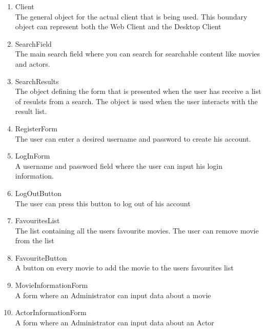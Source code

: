 \begin{enumerate}

	\item Client \hfill \\
	The general object for the actual client that is being used. This boundary object can represent both the Web Client and the Desktop Client

	\item SearchField \hfill \\
	The main search field where you can search for searchable content like movies and actors.
	
	\item SearchResults \hfill \\
	The object defining the form that is presented when the user has receive a list of resulsts from a search. The object is used when the user interacts with the result list.
	
	\item RegisterForm \hfill \\
	The user can enter a desired username and password to create his account.

	\item LogInForm \hfill \\
	A username and password field where the user can input his login information.
	
	\item LogOutButton \hfill \\
	The user can press this button to log out of his account
	
	\item FavouritesList \hfill \\
	The list containing all the users favourite movies. The user can remove movie from the list
	
	\item FavouriteButton \hfill \\
	A button on every movie to add the movie to the users favourites list
	
	\item MovieInformationForm \hfill \\
	A form where an Administrator can input data about a movie
	
	\item ActorInformationForm \hfill \\
	A form where an Administrator can input data about an Actor
	
	
\end{enumerate}

